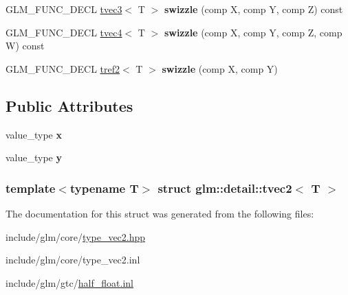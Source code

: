 \begin{DoxyCompactItemize}
\item 
\hypertarget{structglm_1_1detail_1_1tvec2_aeaf8442e0128983acffe4c8f180a4afa}{\-G\-L\-M\-\_\-\-F\-U\-N\-C\-\_\-\-D\-E\-C\-L \hyperlink{structglm_1_1detail_1_1tvec3}{tvec3}$<$ \-T $>$ {\bfseries swizzle} (comp \-X, comp \-Y, comp \-Z) const }\label{structglm_1_1detail_1_1tvec2_aeaf8442e0128983acffe4c8f180a4afa}

\item 
\hypertarget{structglm_1_1detail_1_1tvec2_ab57980ed556297a8698f995d20336d07}{\-G\-L\-M\-\_\-\-F\-U\-N\-C\-\_\-\-D\-E\-C\-L \hyperlink{structglm_1_1detail_1_1tvec4}{tvec4}$<$ \-T $>$ {\bfseries swizzle} (comp \-X, comp \-Y, comp \-Z, comp \-W) const }\label{structglm_1_1detail_1_1tvec2_ab57980ed556297a8698f995d20336d07}

\item 
\hypertarget{structglm_1_1detail_1_1tvec2_a3a37005b6484b97af0d7b10de75303cf}{\-G\-L\-M\-\_\-\-F\-U\-N\-C\-\_\-\-D\-E\-C\-L \hyperlink{structglm_1_1detail_1_1tref2}{tref2}$<$ \-T $>$ {\bfseries swizzle} (comp \-X, comp \-Y)}\label{structglm_1_1detail_1_1tvec2_a3a37005b6484b97af0d7b10de75303cf}

\end{DoxyCompactItemize}
\subsection*{\-Public \-Attributes}
\begin{DoxyCompactItemize}
\item 
\hypertarget{structglm_1_1detail_1_1tvec2_a966c80effc854e7f27f9438de3a03446}{value\-\_\-type {\bfseries x}}\label{structglm_1_1detail_1_1tvec2_a966c80effc854e7f27f9438de3a03446}

\item 
\hypertarget{structglm_1_1detail_1_1tvec2_a12358d18dae79b668519773f58e5931d}{value\-\_\-type {\bfseries y}}\label{structglm_1_1detail_1_1tvec2_a12358d18dae79b668519773f58e5931d}

\end{DoxyCompactItemize}
\subsubsection*{template$<$typename \-T$>$ struct glm\-::detail\-::tvec2$<$ T $>$}



\-The documentation for this struct was generated from the following files\-:\begin{DoxyCompactItemize}
\item 
include/glm/core/\hyperlink{type__vec2_8hpp}{type\-\_\-vec2.\-hpp}\item 
include/glm/core/type\-\_\-vec2.\-inl\item 
include/glm/gtc/\hyperlink{half__float_8inl}{half\-\_\-float.\-inl}\end{DoxyCompactItemize}
